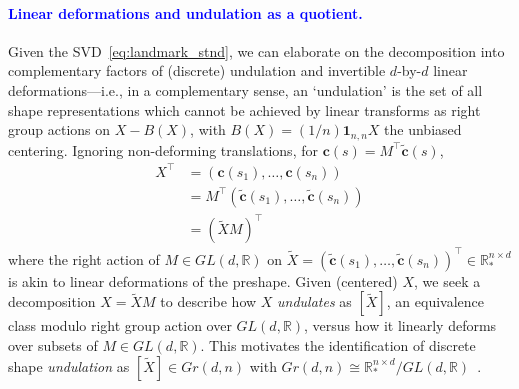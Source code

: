 \documentclass[pdflatex,iicol]{sn-jnl}%
\theoremstyle{thmstyleone}%
\theoremstyle{thmstyletwo}%
\theoremstyle{thmstylethree}%
\begin{document}
\begin{appendices}
\textcolor{blue}{\paragraph{Linear deformations and undulation as a quotient.}}
Given the SVD~\eqref{eq:landmark_stnd}, we can elaborate on the decomposition into complementary factors of (discrete) undulation and invertible $d$-by-$d$ linear deformations---i.e., in a complementary sense, an `undulation' is the set of all shape representations which cannot be achieved by linear transforms as right group actions on $X - B(X)$, with $B(X) = (1/n)\boldsymbol{1}_{n,n}X$ the unbiased centering. Ignoring non-deforming translations, for $\boldsymbol{c}(s) = M^{\top}\widetilde{\boldsymbol{c}}(s)$,
\begin{align}
    X^{\top} &= (\boldsymbol{c}(s_1),\dots,\boldsymbol{c}(s_n))\\ \nonumber
    &= M^{\top}(\widetilde{\boldsymbol{c}}(s_1),\dots,\widetilde{\boldsymbol{c}}(s_n)) \\ \nonumber
    &= (\widetilde{X}M)^{\top} \nonumber
\end{align}
where the right action of $M \in GL(d,\mathbb{R})$ on $\widetilde{X} = (\widetilde{\boldsymbol{c}}(s_1),\dots,\widetilde{\boldsymbol{c}}(s_n))^{\top}\in \mathbb{R}^{n \times d}_*$ is akin to linear deformations of the preshape. Given (centered) $X$, we seek a decomposition $X = \widetilde{X}M$ to describe how $X$ \textit{undulates} as $[\widetilde{X}]$, an equivalence class modulo right group action over $GL(d,\mathbb{R})$, versus how it linearly deforms over subsets of $M \in GL(d,\mathbb{R})$. This motivates the identification of discrete shape \textit{undulation} as $[\widetilde{X}] \in Gr(d,n)$ with $Gr(d,n) \cong \mathbb{R}^{n \times d}_*/GL(d,\mathbb{R})$~\cite{absil2008optimization}.


\end{appendices}
\end{document}
